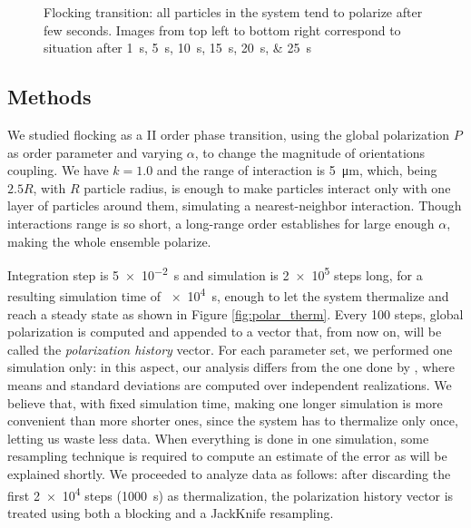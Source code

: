 \documentclass[../../master_thesis_np.tex]{subfiles}
\begin{document}
\begin{figure}[hbtp]
			\caption{Flocking transition: all particles in the system tend to polarize after few seconds. Images from top left to bottom right correspond to situation after \qtylist{1;5;10;15;20;25}{\second}}
			\label{fig:flock40}
		\end{figure}
		
		\subsection{Methods}	
		We studied flocking as a II order phase transition, using the global polarization $P$ as order parameter and varying $\alpha$, to change the magnitude of orientations coupling. 
		We have $k = 1.0$ and the range of interaction is \SI{5}{\micro\meter}, which, being $2.5R$, with $R$ particle radius, is enough to make particles interact only with one layer of particles around them, simulating a nearest-neighbor interaction.
		Though interactions range is so short, a long-range order establishes for large enough $\alpha$, making the whole ensemble polarize.
		
		Integration step is \SI{5e-2}{\second} and simulation is \num{2e5} steps long, for a resulting simulation time of \SI{e4}{\second}, enough to let the system thermalize and reach a steady state as shown in Figure \ref{fig:polar_therm}.
		Every \num{100} steps, global polarization is computed and appended to a vector that, from now on, will be called the \emph{polarization history} vector.
		For each parameter set, we performed one simulation only: in this aspect, our analysis differs from the one done by \citeauthor{martin-gomez_collective_2018}, where means and standard deviations are computed over independent realizations.
		We believe that, with fixed simulation time, making one longer simulation is more convenient than more shorter ones, since the system has to thermalize only once, letting us waste less data.
		When everything is done in one simulation, some resampling technique is required to compute an estimate of the error as will be explained shortly.
		We proceeded to analyze data as follows: after discarding the first \num{2e4} steps (\SI{1000}{\second}) as thermalization, the polarization history vector is treated using both a blocking and a JackKnife resampling.
		
\end{document}
